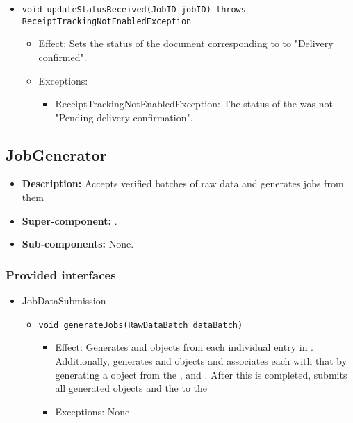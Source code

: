 \begin{itemize}
\begin{itemize}
		\item \texttt{void updateStatusReceived(JobID jobID) throws ReceiptTrackingNotEnabledException}
		\begin{itemize}
            \item Effect: Sets the status of the document corresponding to  to "Delivery confirmed".
            \item Exceptions:
			\begin{itemize}
				\item ReceiptTrackingNotEnabledException: The status of the  was not "Pending delivery confirmation".
			\end{itemize}
        \end{itemize}
    \end{itemize}
\end{itemize}

\subsection{JobGenerator}
\begin{itemize}
	\item \textbf{Description:} Accepts verified batches of raw data and generates jobs from them
	\item \textbf{Super-component:} .
	\item \textbf{Sub-components:} None.
\end{itemize}

\subsubsection*{Provided interfaces}
\begin{itemize}
	\item JobDataSubmission
	\begin{itemize}
		\item \texttt{void generateJobs(RawDataBatch dataBatch)}
		\begin{itemize}
			\item Effect: Generates  and  objects from each individual entry in . Additionally, generates  and  objects and associates each  with that  by generating a  object from the ,  and . After this is completed, submits all generated  objects and the  to the 
			\item Exceptions: None
		\end{itemize}
	\end{itemize}
\end{itemize}

